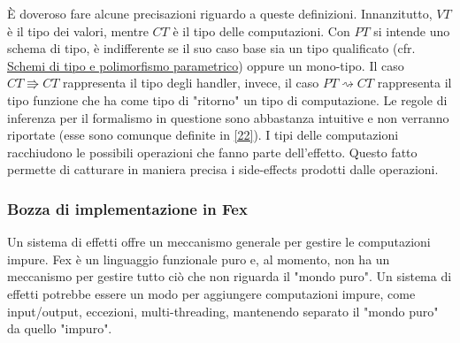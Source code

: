 \documentclass[10pt,a4paper]{article}
\begin{document}
\`E doveroso fare alcune precisazioni riguardo a queste definizioni. Innanzitutto, $ VT $ è il tipo dei valori, mentre
$ CT $ è il tipo delle computazioni. Con $ PT $ si intende uno schema di tipo, è indifferente se il suo caso base sia
un tipo qualificato (cfr. \hyperlink{Schemi di tipo e polimorfismo parametrico}{Schemi di tipo e polimorfismo parametrico})
oppure un mono-tipo. Il caso $ CT \Rrightarrow CT $ rappresenta il tipo degli
handler, invece, il caso $ PT \rightsquigarrow CT $ rappresenta il tipo funzione che ha come tipo di "ritorno" un tipo
di computazione. Le regole di inferenza per il formalismo in questione sono abbastanza intuitive e non verranno riportate
(esse sono comunque definite in \hyperlink{bibl22}{[22]}). I tipi delle computazioni racchiudono le possibili operazioni
che fanno parte dell'effetto. Questo fatto permette di catturare in maniera precisa i side-effects prodotti dalle operazioni.

\subsubsection{Bozza di implementazione in Fex}
Un sistema di effetti offre un meccanismo generale per gestire le computazioni impure. Fex è un linguaggio
funzionale puro e, al momento, non ha un meccanismo per gestire tutto ciò che non riguarda il "mondo puro". Un sistema
di effetti potrebbe essere un modo per aggiungere computazioni impure, come input/output, eccezioni, multi-threading,
mantenendo separato il "mondo puro" da quello "impuro".
\end{document}
